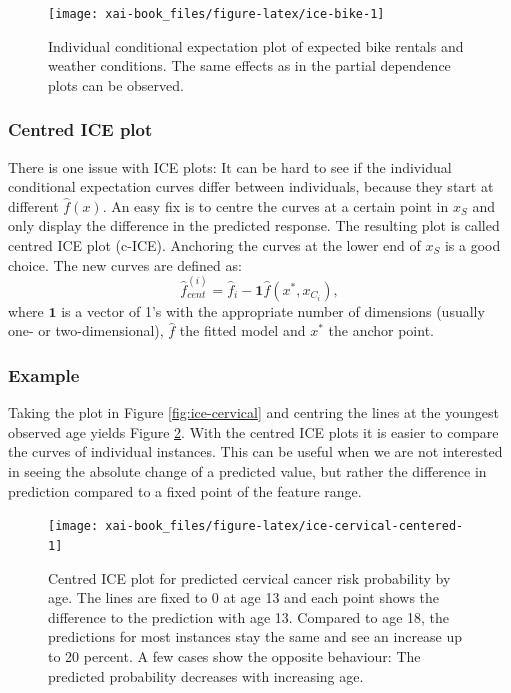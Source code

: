 \documentclass[12pt,]{krantz}
\theoremstyle{definition}
\theoremstyle{definition}
\theoremstyle{definition}
\theoremstyle{remark}
\begin{document}
\begin{figure}

{\centering \texttt{[image: xai-book\_files/figure-latex/ice-bike-1]} 

}

\caption{Individual conditional expectation plot of expected bike rentals and weather conditions. The same effects as in the partial dependence plots can be observed.}\label{fig:ice-bike}
\end{figure}

\subsubsection{Centred ICE plot}\label{centred-ice-plot}

There is one issue with ICE plots: It can be hard to see if the
individual conditional expectation curves differ between individuals,
because they start at different \(\hat{f}(x)\). An easy fix is to centre
the curves at a certain point in \(x_S\) and only display the difference
in the predicted response. The resulting plot is called centred ICE plot
(c-ICE). Anchoring the curves at the lower end of \(x_S\) is a good
choice. The new curves are defined as:
\[\hat{f}_{cent}^{(i)} = \hat{f}_i - \mathbf{1}\hat{f}(x^{\text{*}}, x_{C_i}), \]
where \(\mathbf{1}\) is a vector of 1's with the appropriate number of
dimensions (usually one- or two-dimensional), \(\hat{f}\) the fitted
model and \(x^{\text{*}}\) the anchor point.

\subsubsection{Example}\label{example-2}

Taking the plot in Figure \ref{fig:ice-cervical} and centring the lines
at the youngest observed age yields Figure
\ref{fig:ice-cervical-centered}. With the centred ICE plots it is easier
to compare the curves of individual instances. This can be useful when
we are not interested in seeing the absolute change of a predicted
value, but rather the difference in prediction compared to a fixed point
of the feature range.

\begin{figure}

{\centering \texttt{[image: xai-book\_files/figure-latex/ice-cervical-centered-1]} 

}

\caption{Centred ICE plot for predicted cervical cancer risk probability by age. The lines are fixed to 0 at age 13 and each point shows the difference to the prediction with age 13. Compared to age 18, the predictions for most instances stay the same and see an increase up to 20 percent. A few cases show the opposite behaviour: The predicted probability decreases with increasing age.}\label{fig:ice-cervical-centered}
\end{figure}
\end{document}
